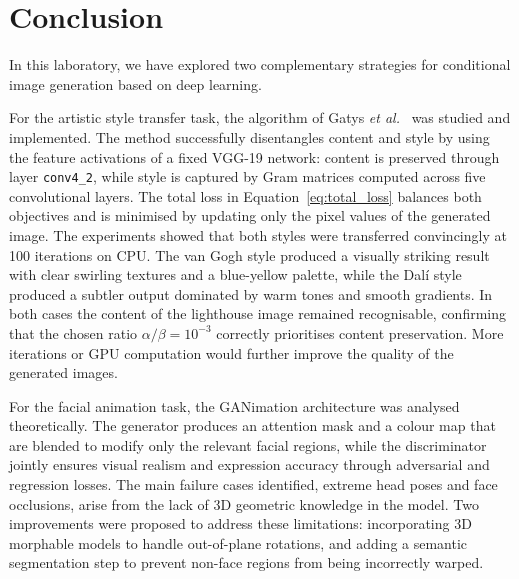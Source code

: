 \documentclass{article}
\begin{document}
\section{Conclusion}
\label{sec:Conclusion}

In this laboratory, we have explored two complementary strategies for conditional image
generation based on deep learning.

For the artistic style transfer task, the algorithm of Gatys \textit{et
al.}~\cite{gatys2015neural} was studied and implemented. The method
successfully disentangles content and style by using the feature activations
of a fixed VGG-19 network: content is preserved through layer \texttt{conv4\_2},
while style is captured by Gram matrices computed across five convolutional
layers. The total loss in Equation~\eqref{eq:total_loss} balances both
objectives and is minimised by updating only the pixel values of the generated
image. The experiments showed that both styles were transferred convincingly
at 100 iterations on CPU. The van Gogh style produced a visually striking
result with clear swirling textures and a blue-yellow palette, while the
Dalí style produced a subtler output dominated by warm tones and smooth
gradients. In both cases the content of the lighthouse image remained
recognisable, confirming that the chosen ratio $\alpha/\beta = 10^{-3}$
correctly prioritises content preservation. More iterations or GPU computation
would further improve the quality of the generated images.

For the facial animation task, the GANimation architecture was analysed
theoretically. The generator produces an attention mask and a colour map that
are blended to modify only the relevant facial regions, while the discriminator
jointly ensures visual realism and expression accuracy through adversarial and
regression losses. The main failure cases identified, extreme head poses and
face occlusions, arise from the lack of 3D geometric knowledge in the model.
Two improvements were proposed to address these limitations: incorporating 3D
morphable models to handle out-of-plane rotations, and adding a semantic
segmentation step to prevent non-face regions from being incorrectly warped.

\nocite{*}


\end{document}
